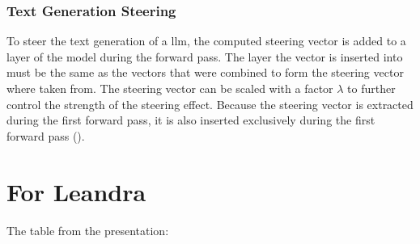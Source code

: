 \subsubsection{Text Generation Steering}
\label{sec:approach:steering:activation}
To steer the text generation of a \acl{llm}, the computed steering vector is added to a layer of the model during the forward pass. The layer the vector is inserted into must be the same as the vectors that were combined to form the steering vector where taken from. The steering vector can be scaled with a factor \(\lambda\) to further control the strength of the steering effect.
Because the steering vector is extracted during the first forward pass, it is also inserted exclusively during the first forward pass (\cite{rimsky-etal-2024-steering}).

\clearpage
\section{For Leandra}

The table from the presentation:

